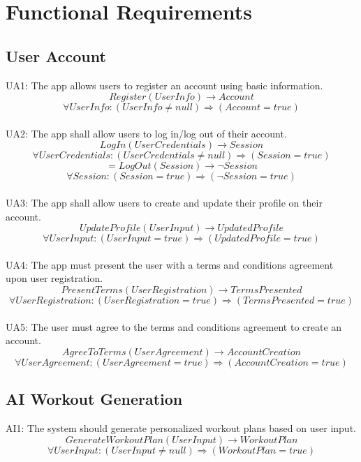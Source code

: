 \documentclass[12pt]{article}
\begin{document}
\section{Functional Requirements}

\subsection{User Account}

\parindent UA1: The app allows users to register an account using basic information.
\[Register(UserInfo) \rightarrow Account \]
\[ \forall UserInfo: (UserInfo \neq null) \Rightarrow (Account = true) \]\\

UA2: The app shall allow users to log in/log out of their account.
\[LogIn(UserCredentials) \rightarrow Session \]
\[ \forall UserCredentials: (UserCredentials \neq null) \Rightarrow (Session = true) \]
\[=LogOut(Session) \rightarrow \neg Session \]
\[ \forall Session: (Session = true) \Rightarrow (\neg Session = true) \]\\

UA3: The app shall allow users to create and update their profile on their account.
\[UpdateProfile(UserInput) \rightarrow UpdatedProfile \]
\[ \forall UserInput: (UserInput = true) \Rightarrow (UpdatedProfile = true) \]\\

UA4: The app must present the user with a terms and conditions agreement upon user registration.
\[PresentTerms(UserRegistration) \rightarrow TermsPresented \]
\[ \forall UserRegistration: (UserRegistration = true) \Rightarrow (TermsPresented = true) \]\\

UA5: The user must agree to the terms and conditions agreement to create an account.
\[AgreeToTerms(UserAgreement) \rightarrow AccountCreation \]
\[ \forall UserAgreement: (UserAgreement = true) \Rightarrow (AccountCreation = true) \]

\subsection{AI Workout Generation}

\parindent AI1: The system should generate personalized workout plans based on user input.
\[GenerateWorkoutPlan(UserInput) \rightarrow WorkoutPlan \]
\[ \forall UserInput: (UserInput \neq null) \Rightarrow (WorkoutPlan = true) \]\\
\end{document}
